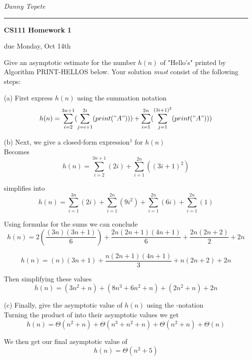 \documentclass[11pt]{article}
\newcommand{\student}[1]{{\noindent\Large\em {#1} \hfill}\vskip 0.1in}
\newcommand{\assignment}[1]{\centerline{\large\bf CS111 Homework {#1}}}
\newcommand{\duedate}[1]{{\centerline{due {#1}}}}
\newcounter{prnum}
\newenvironment{problem}{{\vskip 0.2in\noindent\bf Problem
       \addtocounter{prnum}{1} \arabic{prnum}.}}{\vskip 0.1in}
\begin{document}
\student{Danny Topete} %
\vskip 0.1in\noindent\hrule\vskip 0.2in
\assignment{1}                           %
\duedate{Monday, Oct 14th}              %


\begin{problem}
Give an asymptotic estimate for the number $h(n)$ of "Hello's" printed by Algorithm PRINT-HELLOS below. 
Your solution \textit{must} consist of the following steps:

(a) First express $h(n)$
using the summation notation \Sigma \\

\begin{equation*}
  h(n) = \sum_{i=2}^{3n+1} (\sum_{j=i+1}^{2i}(print("A"))) 
  + \sum_{i=1}^{2n}(\sum_{j=1}^{(3i+1)^2}(print("A")))
\end{equation*}

(b) Next, we give a closed-form expression$^1$ for $h(n)$ \\

Becomes
\begin{equation}
  h(n) = \sum_{i=2}^{3n+1}(2i)  
  + \sum_{i=1}^{2n}((3i+1)^2)
\end{equation}

simplifies into
\begin{equation}
  h(n) = \sum_{i=1}^{3n}(2i)  
  + \sum_{i=1}^{2n}(9i^2)
  + \sum_{i=1}^{2n}(6i)
  + \sum_{i=1}^{2n}(1)
\end{equation}

Using formulas for the sums we can conclude
\begin{equation}
  h(n) = 2(\frac{(3n)(3n+1)}{6})
  + \frac{2n(2n+1)(4n+1)}{6} 
  + \frac{2n(2n+2)}{2} 
  + 2n 
\end{equation}

\begin{equation}
  h(n) = (n)(3n+1)
  + \frac{n(2n+1)(4n+1)}{3} 
  + n(2n+2) 
  + 2n 
\end{equation}

\smallskip
Then simplifying these values
\begin{equation}
  h(n) = (3n^2 + n)
  + (8n^3 + 6n^2 + n)
  + (2n^2 + n)
  + 2n 
\end{equation}

(c) Finally, give the asymptotic value of $h(n)$ using the \Theta-notation \\

Turning the product of into their asymptotic values we get
\begin{equation}
  h(n) = \Theta(n^2 + n)
  + \Theta(n^3 + n^2 + n)
  + \Theta(n^2 + n)
  + \Theta(n) 
\end{equation}

We then get our final asymptotic value of
\begin{equation}
h(n) = \Theta(n^2 + 5)
\end{equation}

\end{problem} 
\clearpage
\end{document}
